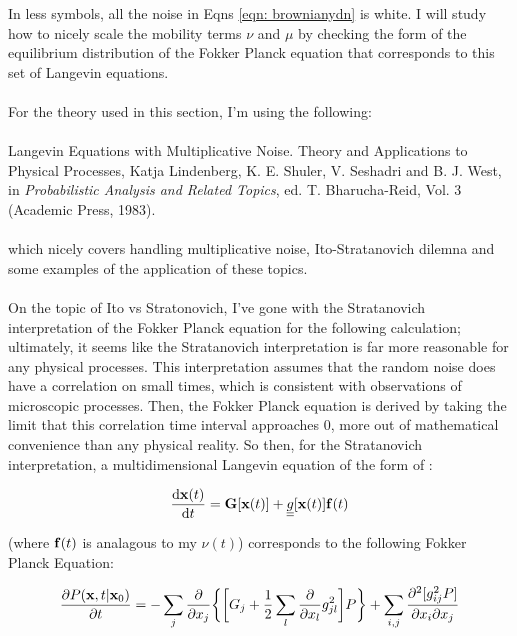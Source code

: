 \documentclass[12pt]{article}
\begin{document}
In less symbols, all the noise in Eqns \ref{eqn: brownianydn} is white. I will study how to nicely scale the mobility terms $\nu$ and $\mu$ by checking the form of the equilibrium distribution of the Fokker Planck equation that corresponds to this set of Langevin equations. \\ \\
For the theory used in this section, I'm using the following: \\\\
Langevin Equations with Multiplicative Noise. Theory and Applications to Physical Processes,
Katja Lindenberg, K. E. Shuler, V. Seshadri and B. J. West, in \textit{Probabilistic Analysis and Related
Topics}, ed. T. Bharucha-Reid, Vol. 3 (Academic Press, 1983).
\\ \\
which nicely covers handling multiplicative noise, Ito-Stratanovich dilemna and some examples of the application of these topics. \\ \\
On the topic of Ito vs Stratonovich, I've gone with the Stratanovich interpretation of the Fokker Planck equation for the following calculation; ultimately, it seems like the Stratanovich interpretation is far more reasonable for any physical processes. This interpretation assumes that the random noise does have a correlation on small times, which is consistent with observations of microscopic processes. Then, the Fokker Planck equation is derived by taking the limit that this correlation time interval approaches 0, more out of mathematical convenience than any physical reality. So then, for the Stratanovich interpretation, a multidimensional Langevin equation of the form of :
\begin{center}
\begin{equation}
\label{eqn: lindenberg1}
\dv{\vb{x}(t)}{t} = \vb{G}[\vb{x}(t)] + \underline{\underline{g}}[\vb{x}(t)]\vb{f}(t)  
\end{equation}
\end{center}
(where $\vb{f}(t)$ is analagous to my $ \nu(t)$) corresponds to the following Fokker Planck Equation:
\begin{center}
\begin{equation}
\label{eqn: sfp}
\pdv{P(\vb{x} ,t|\vb{x}_0)}{t} = -\sum\limits_j \pdv{x_j} \bigg\{ \bigg[G_j + \frac{1}{2} \sum\limits_l \pdv{x_l} g^2_{jl}\bigg]P\bigg\} + \sum\limits_{i,j} \pdv{[g_{ij}^2 P]}{x_i}{x_j}
\end{equation}
\end{center}
\end{document}
